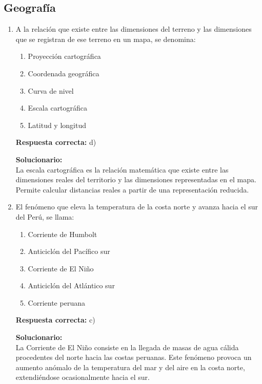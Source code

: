 \vspace{6mm}



\subsection*{Geografía}

\begin{enumerate}
	
\item A la relación que existe entre las dimensiones del terreno y las dimensiones que se registran de ese terreno en un mapa, se denomina:

\begin{enumerate}[label=\alph*)]
	\item Proyección cartográfica
	\item Coordenada geográfica
	\item Curva de nivel
	\item Escala cartográfica
	\item Latitud y longitud
\end{enumerate}

\textbf{Respuesta correcta:} d)

\vspace{2mm}
\textbf{Solucionario:}\\
La escala cartográfica es la relación matemática que existe entre las dimensiones reales del territorio y las dimensiones representadas en el mapa. Permite calcular distancias reales a partir de una representación reducida.

\vspace{6mm}

\item El fenómeno que eleva la temperatura de la costa norte y avanza hacia el sur del Perú, se llama:

\begin{enumerate}[label=\alph*)]
	\item Corriente de Humbolt
	\item Anticiclón del Pacífico sur
	\item Corriente de El Niño
	\item Anticiclón del Atlántico sur
	\item Corriente peruana
\end{enumerate}

\textbf{Respuesta correcta:} c)

\vspace{2mm}
\textbf{Solucionario:}\\
La Corriente de El Niño consiste en la llegada de masas de agua cálida procedentes del norte hacia las costas peruanas. Este fenómeno provoca un aumento anómalo de la temperatura del mar y del aire en la costa norte, extendiéndose ocasionalmente hacia el sur.

\vspace{6mm}	
	
\end{enumerate}


